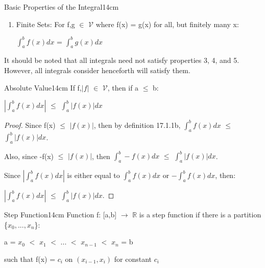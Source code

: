\begin{definition}{Basic Properties of the Integral}{14cm}
\begin{enumerate}[label=(\alph*), leftmargin=1cm, itemsep=0.1cm]
                \hspace{0.5cm}
                $\int_a^b C dx$ = $C(b-a)$

            \item {\color{lblue} Finite Sets}:
                For f,g $\in$ $\mathcal{V}$ where f(x) = g(x)
                for all, but finitely many x:
            
                \hspace{0.5cm}
                $\int_a^b f(x) dx$ = $\int_a^b g(x) dx$
        \end{enumerate}

        It should be noted that all integrals need not satisfy properties
        3, 4, and 5. However, all integrals consider henceforth will satisfy them.
    \end{definition}

    \vspace{0.5cm}



    \begin{wtheorem}{Absolute Value}{14cm}
        If f,$|f|$ $\in$ $\mathcal{V}$, then if a $\leq$ b:

        \hspace{0.5cm}
        $|\int_a^b f(x) dx|$
        $\leq$ $\int_a^b |f(x)| dx$
    \end{wtheorem}

    \begin{proof}
        Since f(x) $\leq$ $|f(x)|$, then by {\color{blue} definition 17.1.1b},
        $\int_a^b f(x) dx$ $\leq$ $\int_a^b |f(x)| dx$.

        Also, since -f(x) $\leq$ $|f(x)|$, then
        $\int_a^b -f(x) dx$ $\leq$ $\int_a^b |f(x)| dx$.
        
        Since $|\int_a^b f(x) dx|$ is either equal to
        $\int_a^b f(x) dx$ or $-\int_a^b f(x) dx$, then:
        
        \hspace{0.5cm}
        $|\int_a^b f(x) dx|$ $\leq$ $\int_a^b |f(x)| dx$.
    \end{proof}

    \vspace{0.5cm}



    \begin{definition}{Step Function}{14cm}
        Function f: [a,b] $\rightarrow$ $\mathbb{R}$
        is a {\color{lblue} step function} if there is
        a partition \{$x_0,...,x_n$\}:

        \hspace{0.5cm}
        a = $x_0$ $<$ $x_1$ $<$ ... $<$ $x_{n-1}$ $<$ $x_n$ = b

        such that f(x) = $c_i$ on $(x_{i-1},x_i)$ for constant $c_i$ 
    \end{definition}

